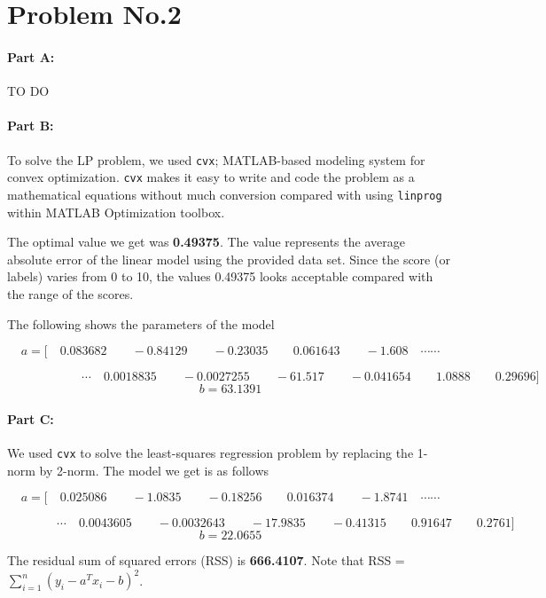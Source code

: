 \section*{Problem No.2} \label{sec:prob2}



\paragraph{Part A:}
\begin{Huge}
TO DO
\end{Huge}
\paragraph{Part B:}
To solve the LP problem, we used \texttt{cvx}; MATLAB-based modeling system for convex optimization. \texttt{cvx} makes it easy to write and code the problem as a mathematical equations without much conversion compared with using \texttt{linprog} within MATLAB Optimization toolbox. 

The optimal value we get was \textbf{0.49375}. The value represents the average absolute error of the linear model using the provided data set. Since the score (or labels) varies from 0 to 10, the values 0.49375 looks acceptable compared with the range of the scores.

The following shows the parameters of the model
\begin{footnotesize}
$$
a= \text{[}\quad 0.083682\qquad -0.84129\qquad -0.23035\qquad 0.061643\qquad -1.608 \quad \cdots\cdots
$$

$$
\qquad \qquad \qquad \cdots \quad 0.0018835\qquad -0.0027255\qquad -61.517\qquad -0.041654\qquad 1.0888\qquad 0.29696 \text{]}
$$
$$
b = 63.1391
$$
\end{footnotesize}


\paragraph{Part C:}
We used \texttt{cvx} to solve the least-squares regression problem by replacing the 1-norm by 2-norm. The model we get is as follows 
\begin{footnotesize}
$$
a= \text{[}\quad 0.025086 \qquad -1.0835 \qquad -0.18256 \qquad 0.016374 \qquad -1.8741\quad \cdots\cdots
$$

$$
\qquad \qquad  \cdots \quad 0.0043605 \qquad -0.0032643 \qquad -17.9835 \qquad -0.41315 \qquad 0.91647 \qquad 0.2761  \text{]}
$$
$$
b = 22.0655
$$
\end{footnotesize}
The residual sum of squared errors (RSS) is \textbf{666.4107}. Note that  RSS = $\sum_{i=1}^{n}(y_{i}-a^{T}x_{i}-b)^{2}$.  %

